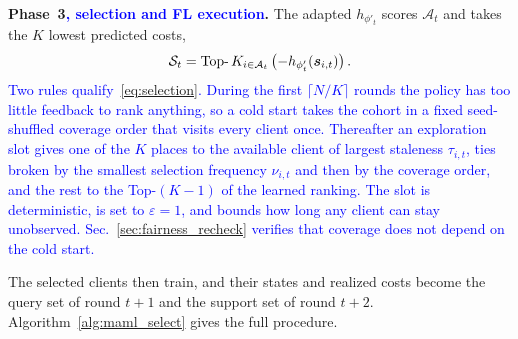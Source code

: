 \documentclass[journal]{IEEEtran}
\theoremstyle{remark}
\newcommand{\revision}[1]{#1}
\newcommand{\revtwo}[1]{\textcolor{blue}{#1}}
\begin{document}
\textbf{Phase~3\revtwo{, selection and FL execution}.}
\revision{The adapted $h_{\phi'_t}$ scores $\mathcal{A}_t$ and takes the $K$ lowest predicted costs,}
\begin{equation}
	\color{black}
	\mathcal{S}_t = \operatorname{Top-}K_{i \in \mathcal{A}_t} \left( -h_{\phi'_t}(\bm{s}_{i,t}) \right).
	\label{eq:selection}
\end{equation}
\revtwo{Two rules qualify~\eqref{eq:selection}. During the first $\lceil N/K\rceil$ rounds the policy has too little feedback to rank anything, so a cold start takes the cohort in a fixed seed-shuffled coverage order that visits every client once. Thereafter an exploration slot gives one of the $K$ places to the available client of largest staleness $\tau_{i,t}$, ties broken by the smallest selection frequency $\nu_{i,t}$ and then by the coverage order, and the rest to the Top-$(K-1)$ of the learned ranking. The slot is deterministic, is set to $\varepsilon=1$, and bounds how long any client can stay unobserved. Sec.~\ref{sec:fairness_recheck} verifies that coverage does not depend on the cold start.}

\revision{The selected clients then train, and their states and realized costs become the query set of round $t+1$ and the support set of round $t+2$. Algorithm~\ref{alg:maml_select} gives the full procedure.}
\end{document}
